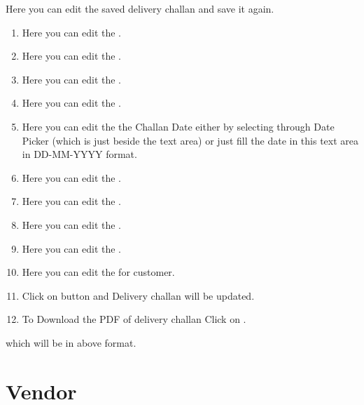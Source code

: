 \documentclass[letterpaper,10pt,english]{sphinxmanual}
\begin{document}
Here you can edit the saved delivery challan and save it again.
\begin{enumerate}
\item {} 
Here you can edit the  .

\item {} 
Here you can edit the  .

\item {} 
Here you can edit the  .

\item {} 
Here you can edit the  .

\item {} 
Here you can edit the the Challan Date either by selecting through Date Picker (which is just beside the text area) or just fill the date in this text area in DD-MM-YYYY format.

\item {} 
Here you can edit the  .

\item {} 
Here you can edit the  .

\item {} 
Here you can edit the  .

\item {} 
Here you can edit the  .

\item {} 
Here you can edit the  for customer.

\item {} 
Click on  button and Delivery challan will be updated.

\item {} 
To Download the PDF of delivery challan Click on  .

\end{enumerate}

\begin{figure}[htbp]
\centering

\noindent{}
\end{figure}

which will be in above format.


\chapter{Vendor}
\label{\detokenize{vendor:vendor}}\label{\detokenize{vendor::doc}}
\begin{figure}[htbp]
\centering

\noindent{}
\end{figure}
\end{document}
